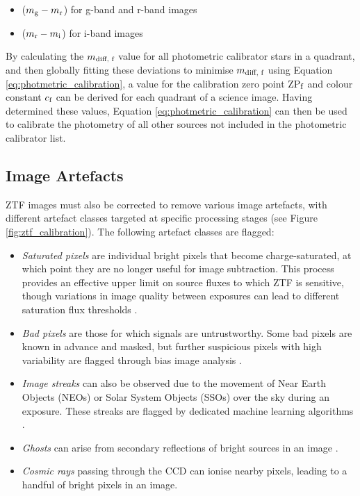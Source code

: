 \begin{itemize}
	\item ($m_{\textup{g}} - m_{\textup{r}}$) for g-band and r-band images
	\item ($m_{\textup{r}} - m_{\textup{i}}$) for i-band images
\end{itemize}

By calculating the $m_{\textup{diff, f}}$ value for all photometric calibrator stars in a quadrant, and then globally fitting these deviations to minimise $m_{\textup{diff, f}}$ using Equation \ref{eq:photmetric_calibration}, a value for the calibration zero point ZP$_{\textup{f}}$ and colour constant $c_{\textup{f}}$ can be derived for each quadrant of a science image. Having determined these values, Equation \ref{eq:photmetric_calibration} can then be used to calibrate the photometry of all other sources not included in the photometric calibrator list.

\subsection*{Image Artefacts}

ZTF images must also be corrected to remove various image artefacts, with different artefact classes targeted at specific processing stages (see Figure \ref{fig:ztf_calibration}). The following artefact classes are flagged:

\begin{itemize}
	\item\emph{Saturated pixels} are individual bright pixels that become charge-saturated, at which point they are no longer useful for image subtraction. This process provides an effective upper limit on source fluxes to which ZTF is sensitive, though variations in image quality between exposures can lead to different saturation flux thresholds \cite{ztf_data_processing}.
	\item \emph{Bad pixels} are those for which signals are untrustworthy. Some bad pixels are known in advance and masked, but further suspicious pixels with high variability are flagged through bias image analysis \cite{ztf_data_processing}. 
	\item \emph{Image streaks} can also be observed due to the movement of Near Earth Objects (NEOs) or Solar System Objects (SSOs) over the sky during an exposure. These streaks are flagged by dedicated machine learning algorithms  .
	\item \emph{Ghosts} can arise from secondary reflections of bright sources in an image .
	\item \emph{Cosmic rays} passing through the CCD can ionise nearby pixels, leading to a handful of bright pixels in an image.
\end{itemize}

